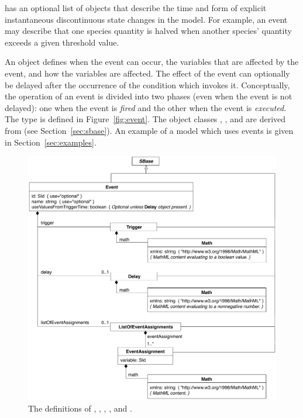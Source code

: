\Model has an optional list of \Event objects that describe the
time and form of explicit instantaneous discontinuous state
changes in the model.  For example, an event may describe that one
species quantity is halved when another species' quantity exceeds a
given threshold value.

An \Event object defines when the event can occur, the variables
that are affected by the event, and how the variables are
affected.  The effect of the event can optionally be delayed after
the occurrence of the condition which invokes it.  Conceptually,
the operation of an event is divided into two phases (even when
the event is not delayed): one when the event is \emph{fired} and
the other when the event is \emph{executed}. The \Event type is
defined in Figure~\vref{fig:event}.  The object classes \Event,
\Trigger, \Delay and \EventAssignment are derived from \SBase{}
(see Section~\ref{sec:sbase}).  An example of a model which uses
events is given in Section~\ref{sec:examples}.

\begin{figure}[htb]
  \centering
  \small
  \vspace*{-1.2ex}
  \includegraphics[scale=0.68]{figs/event-uml}
  \vspace*{-1.2ex}
  \caption{The definitions of \Event, \Trigger, \Delay,
    \EventAssignment, and \ListOfEventAssignments.}
  \label{fig:event}
\end{figure}


